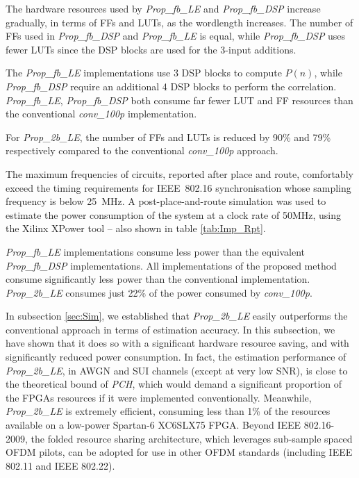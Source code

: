 The hardware resources used by \emph{Prop\_fb\_LE} and \emph{Prop\_fb\_DSP} increase gradually, in terms of FFs and LUTs, as the wordlength increases.
The number of FFs used in \emph{Prop\_fb\_DSP} and \emph{Prop\_fb\_LE} is equal, while \emph{Prop\_fb\_DSP} uses fewer LUTs since the DSP blocks are used for the 3-input additions.

The \emph{Prop\_fb\_LE} implementations use 3 DSP blocks to compute $P(n)$, while \emph{Prop\_fb\_DSP} require an additional 4 DSP blocks to perform the correlation.
\emph{Prop\_fb\_LE}, \emph{Prop\_fb\_DSP} both consume far fewer LUT and FF resources than the conventional \emph{conv\_100p} implementation.

For \emph{Prop\_2b\_LE}, the number of FFs and LUTs is reduced by 90\% and 79\% respectively compared to the conventional \emph{conv\_100p} approach.

The maximum frequencies of circuits, reported after place and route, comfortably exceed the timing requirements for IEEE~802.16 synchronisation whose sampling frequency is below 25~MHz.
A post-place-and-route simulation was used to estimate the power consumption of the system at a clock rate of 50{\thinspace}MHz, using the Xilinx XPower tool -- also shown in table \ref{tab:Imp_Rpt}.

\emph{Prop\_fb\_LE} implementations consume less power than the equivalent \emph{Prop\_fb\_DSP} implementations.
All implementations of the proposed method consume significantly less power than the conventional implementation.
\emph{Prop\_2b\_LE} consumes just 22\% of the power consumed by \emph{conv\_100p}.

In subsection \ref{sec:Sim}, we established that \emph{Prop\_2b\_LE} easily outperforms the conventional approach in terms of estimation accuracy.
In this subsection, we have shown that it does so with a significant hardware resource saving, and with significantly reduced power consumption.
In fact, the estimation performance of \emph{Prop\_2b\_LE}, in AWGN and SUI channels (except at very low SNR), is close to the theoretical bound of \emph{PCH}, which would demand a significant proportion of the FPGAs resources if it were implemented conventionally.
Meanwhile, \emph{Prop\_2b\_LE} is extremely efficient, consuming less than 1\% of the resources available on a low-power Spartan-6 XC6SLX75 FPGA.
Beyond IEEE 802.16-2009, the folded resource sharing architecture, which leverages sub-sample spaced OFDM pilots, can be adopted for use in other OFDM standards (including IEEE 802.11 and IEEE 802.22).

